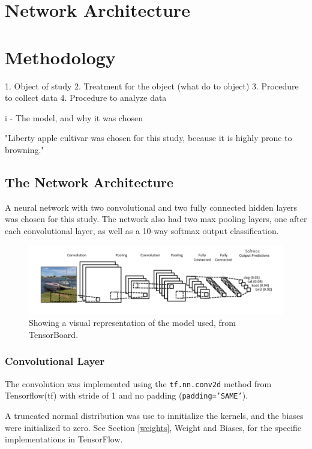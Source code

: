 \documentclass[]{article}
\begin{document}
\section{Network Architecture}



\section{Methodology}

1. Object of study
2. Treatment for the object (what do to object)
3. Procedure to collect data
4. Procedure to analyze data

i - The model, and why it was chosen

"Liberty apple cultivar was chosen for this study, because it is highly prone to browning."

\subsection{The Network Architecture}

A neural network with two convolutional and two fully connected hidden layers was chosen for this study. The network also had two max pooling layers, one after each convolutional layer, as well as a 10-way softmax output classification. 

\begin{figure}[h]
	\includegraphics[width=\textwidth]{conv}
	\caption{Showing a visual representation of the model used, from TensorBoard.}
	\label{conv}
	\centering
\end{figure}

\subsubsection{Convolutional Layer}

The convolution was implemented using the \texttt{tf.nn.conv2d} method from Tensorflow(tf) with stride of 1 and no padding (\texttt{padding='SAME'}). 

A truncated normal distribution was use to innitialize the kernels, and the biases were initialized to zero. See Section \ref{weights}, Weight and Biases, for the specific implementations in TensorFlow. 
\end{document}

